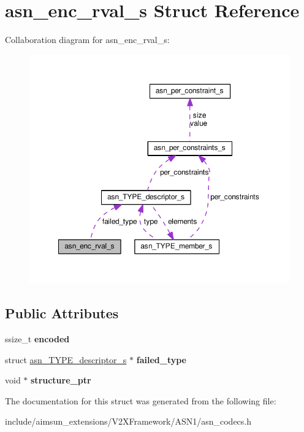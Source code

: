 \hypertarget{structasn__enc__rval__s}{}\section{asn\+\_\+enc\+\_\+rval\+\_\+s Struct Reference}
\label{structasn__enc__rval__s}


Collaboration diagram for asn\+\_\+enc\+\_\+rval\+\_\+s\+:\nopagebreak
\begin{figure}[H]
\begin{center}
\leavevmode
\includegraphics[width=350pt]{structasn__enc__rval__s__coll__graph}
\end{center}
\end{figure}
\subsection*{Public Attributes}
\begin{DoxyCompactItemize}
\item 
ssize\+\_\+t {\bfseries encoded}\hypertarget{structasn__enc__rval__s_ada573b8183a1af819ea3df7a7ea1ba04}{}\label{structasn__enc__rval__s_ada573b8183a1af819ea3df7a7ea1ba04}

\item 
struct \hyperlink{structasn__TYPE__descriptor__s}{asn\+\_\+\+T\+Y\+P\+E\+\_\+descriptor\+\_\+s} $\ast$ {\bfseries failed\+\_\+type}\hypertarget{structasn__enc__rval__s_acee9a75458f1f584db5e913886e9a363}{}\label{structasn__enc__rval__s_acee9a75458f1f584db5e913886e9a363}

\item 
void $\ast$ {\bfseries structure\+\_\+ptr}\hypertarget{structasn__enc__rval__s_a5e01236558d9500760cfa6d679fb6d67}{}\label{structasn__enc__rval__s_a5e01236558d9500760cfa6d679fb6d67}

\end{DoxyCompactItemize}


The documentation for this struct was generated from the following file\+:\begin{DoxyCompactItemize}
\item 
include/aimsun\+\_\+extensions/\+V2\+X\+Framework/\+A\+S\+N1/asn\+\_\+codecs.\+h\end{DoxyCompactItemize}
